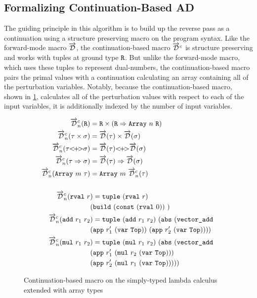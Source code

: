 \subsection{Formalizing Continuation-Based AD}\label{sec:continuation-base}
  The guiding principle in this algorithm is to build up the reverse pass as a continuation using a structure preserving macro on the program syntax.
  Like the forward-mode macro $\overrightarrow{\mathcal{D}}$, the continuation-based macro $\overrightarrow{\mathcal{D}}^c$ is structure preserving and works with tuples at ground type $\texttt{R}$.
  But unlike the forward-mode macro, which uses these tuples to represent dual-numbers, the continuation-based macro pairs the primal values with a continuation calculating an array containing all of the perturbation variables.
  Notably, because the continuation-based macro, shown in \cref{fig:continuation_macro}, calculates all of the perturbation values with respect to each of the input variables, it is additionally indexed by the number of input variables.

  \begin{figure}[H]
    \centering
    \begin{gather*}
      \begin{aligned}
        \overrightarrow{\mathcal{D}}^c_n(\texttt{R}) &= \texttt{R} \times (\texttt{R} \Rightarrow \texttt{Array}\ n\ \texttt{R}) \\
        \overrightarrow{\mathcal{D}}^c_n(\tau \times \sigma) &= \overrightarrow{\mathcal{D}}(\tau) \times \overrightarrow{\mathcal{D}}(\sigma) \\
        \overrightarrow{\mathcal{D}}^c_n(\tau {<}\!{+}\!{>} \sigma) &= \overrightarrow{\mathcal{D}}(\tau) {<}\!{+}\!{>} \overrightarrow{\mathcal{D}}(\sigma) \\
        \overrightarrow{\mathcal{D}}^c_n(\tau \Rightarrow \sigma) &= \overrightarrow{\mathcal{D}}(\tau) \Rightarrow \overrightarrow{\mathcal{D}}(\sigma) \\
        \overrightarrow{\mathcal{D}}^c_n(\texttt{Array}\ m\ \tau) &= \texttt{Array}\ m\ \overrightarrow{\mathcal{D}}^c_n(\tau) \\
      \\
        \overrightarrow{\mathcal{D}}^c_n(\texttt{rval}\ r&) = \texttt{tuple}\ (\texttt{rval}\ r)\ \\
          &{(\texttt{build}\ (\texttt{const}\ (\texttt{rval}\ 0))\ )} \\
        \overrightarrow{\mathcal{D}}^c_n(\texttt{add}\ r_1\ r_2&) = \texttt{tuple}\ (\texttt{add}\ r_1\ r_2)\ (\texttt{abs}\ (\texttt{vector\_add}\  \\
        &(\texttt{app}\ r_1'\ (\texttt{var}\ \texttt{Top}))\ (\texttt{app}\ r_2'\ (\texttt{var}\ \texttt{Top})))) \\
        \overrightarrow{\mathcal{D}}^c_n(\texttt{mul}\ r_1\ r_2&) = \texttt{tuple}\ (\texttt{mul}\ r_1\ r_2)\ (\texttt{abs}\ (\texttt{vector\_add}\  \\
        &(\texttt{app}\ r_1'\ (\texttt{mul}\ r_2\ (\texttt{var}\ \texttt{Top})))\  \\
        &(\texttt{app}\ r_2'\ (\texttt{mul}\ r_1\ (\texttt{var}\ \texttt{Top}))))) \\
      \end{aligned}
    \end{gather*}
    \caption{Continuation-based macro on the simply-typed lambda calculus extended with array types}
    \label{fig:continuation_macro}
  \end{figure}

